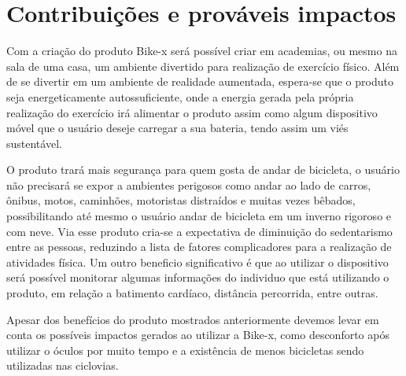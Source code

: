 \chapter[Impactos]{Contribuições e prováveis impactos}

Com a criação do produto Bike-x será possível criar em academias, ou mesmo na sala de uma casa, um ambiente divertido para realização de exercício físico. Além de se divertir em um ambiente de realidade aumentada, espera-se que o produto seja energeticamente autossuficiente, onde a energia gerada pela própria realização do exercício irá alimentar o produto assim como algum dispositivo móvel que o usuário deseje carregar a sua bateria, tendo assim um viés sustentável.  

O produto trará mais segurança para quem gosta de andar de bicicleta, o usuário não precisará se expor a ambientes perigosos como andar ao lado de carros, ônibus, motos, caminhões, motoristas distraídos e muitas vezes bêbados, possibilitando até mesmo o usuário andar de bicicleta em um inverno rigoroso e com neve. Via esse produto cria-se a expectativa de diminuição do sedentarismo entre as pessoas, reduzindo a lista de fatores complicadores para a realização de atividades física. Um outro beneficio significativo é que ao utilizar o dispositivo será possível monitorar algumas informações do individuo que está utilizando o produto, em relação a batimento cardíaco, distância percorrida, entre outras.

Apesar dos benefícios do produto mostrados anteriormente devemos levar em conta os possíveis impactos gerados ao utilizar a Bike-x, como desconforto após utilizar o óculos por muito tempo e a existência de menos bicicletas sendo utilizadas nas ciclovias.

